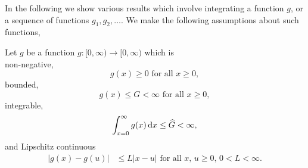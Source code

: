 In the following we show various results which involve integrating a function \(g\), or a sequence of functions \(g_1,g_2,\dots\). We make the following assumptions about such functions, 
\begin{asu}\label{asu: g}
	Let \(g\) be a function \(g:[0,\infty)\to [0,\infty)\) which is \\
	\subasu \label{asu: g non-neg} non-negative, 
	\[g(x) \geq 0 \mbox{ for all } x \geq 0,\]
	\subasu bounded, 
	\[g(x) \leq G < \infty \mbox{ for all } x \geq 0,\]
	\subasu integrable, 
	\[\int_{x=0}^\infty g(x)\, \mathrm{d} x \leq \widehat G < \infty,\]
	\subasu \label{asu: lipschitz} and Lipschitz continuous 
	\begin{align}
		|g(x) - g(u)|&\leq L|x - u| \mbox{ for all } x,\, u \geq 0,\, 0<L<\infty.
	\end{align}
\end{asu}

